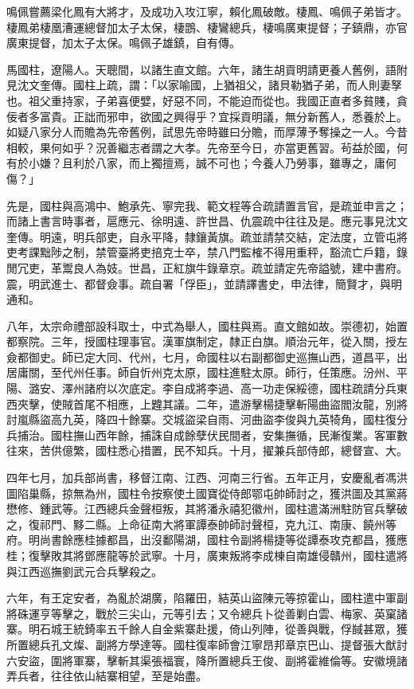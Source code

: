 \begin{pinyinscope}
鳴佩嘗薦梁化鳳有大將才，及成功入攻江寧，賴化鳳破敵。棲鳳、鳴佩子弟皆才。棲鳳弟棲凰漕運總督加太子太保，棲鵾、棲鸞總兵，棲鳴廣東提督；子鎮鼎，亦官廣東提督，加太子太保。鳴佩子雄鎮，自有傳。

馬國柱，遼陽人。天聰間，以諸生直文館。六年，諸生胡貢明請更養人舊例，語附見沈文奎傳。國柱上疏，謂：「以家喻國，上猶祖父，諸貝勒猶子弟，而人則妻孥也。祖父重持家，子弟喜便嬖，好惡不同，不能迫而從也。我國正直者多貧賤，貪佞者多富貴。正詘而邪申，欲國之興得乎？宜採貢明議，無分新舊人，悉養於上。如疑八家分人而贍為先帝舊例，試思先帝時雖曰分贍，而厚薄予奪操之一人。今昔相較，果何如乎？況善繼志者謂之大孝。先帝至今日，亦當更舊習。茍益於國，何有於小嫌？且利於八家，而上獨擅焉，誠不可也；今養人乃勞事，雖專之，庸何傷？」

先是，國柱與高鴻中、鮑承先、寧完我、範文程等合疏請置言官，是疏並申言之；而諸上書言時事者，扈應元、徐明遠、許世昌、仇震疏中往往及是。應元事見沈文奎傳。明遠，明兵部吏，自永平降，隸鑲黃旗。疏並請禁交結，定法度，立管屯將吏考課黜陟之制，禁管臺將吏掊克士卒，禁八門監榷不得用重秤，豁流亡戶籍，錄閒冗吏，革鬻良人為妓。世昌，正紅旗牛錄章京。疏並請定先帝謚號，建中書府。震，明武進士、都督僉事。疏自署「俘臣」，並請譯書史，申法律，簡賢才，與明通和。

八年，太宗命禮部設科取士，中式為舉人，國柱與焉。直文館如故。崇德初，始置都察院。三年，授國柱理事官。漢軍旗制定，隸正白旗。順治元年，從入關，授左僉都御史。師已定大同、代州，七月，命國柱以右副都御史巡撫山西，道昌平，出居庸關，至代州任事。師自忻州克太原，國柱進駐太原。師行，任策應。汾州、平陽、潞安、澤州諸府以次底定。李自成將李過、高一功走保綏德，國柱疏請分兵東西夾擊，使賊首尾不相應，上韙其議。二年，遣游擊楊捷擊斬陽曲盜閻汝龍，別將討嵐縣盜高九英，降四十餘寨。交城盜梁自雨、河曲盜李俊與九英犄角，國柱復分兵捕治。國柱撫山西年餘，捕誅自成餘孽伏民間者，安集撫循，民漸復業。客軍數往來，苦供億繁，國柱悉心措置，民不知兵。十月，擢兼兵部侍郎，總督宣、大。

四年七月，加兵部尚書，移督江南、江西、河南三行省。五年正月，安慶亂者馮洪圖陷巢縣，掠無為州，國柱令按察使土國寶從侍郎鄂屯帥師討之，獲洪圖及其黨蔣懋修、鍾武等。江西總兵金聲桓叛，其將潘永禧犯徽州，國柱遣滿洲駐防官兵擊破之，復祁門、黟二縣。上命征南大將軍譚泰帥師討聲桓，克九江、南康、饒州等府。明尚書餘應桂據都昌，出沒鄱陽湖，國柱令副將楊捷等從譚泰攻克都昌，獲應桂；復擊敗其將鄧應龍等於武寧。十月，廣東叛將李成棟自南雄侵贛州，國柱遣將與江西巡撫劉武元合兵擊殺之。

六年，有王定安者，為亂於湖廣，陷羅田，結英山盜陳元等掠霍山，國柱遣中軍副將硃運亨等擊之，戰於三尖山，元等引去；又令總兵卜從善剿白雲、梅家、英窠諸寨。明石城王統錡率五千餘人自金紫寨赴援，倚山列陣，從善與戰，俘馘甚眾，獲所置總兵孔文燦、副將方學達等。國柱復率師會江寧昂邦章京巴山、提督張大猷討六安盜，圍將軍寨，擊斬其渠張福寰，降所置總兵王俊、副將霍維倫等。安徽境諸弄兵者，往往依山結寨相望，至是始盡。


\end{pinyinscope}
